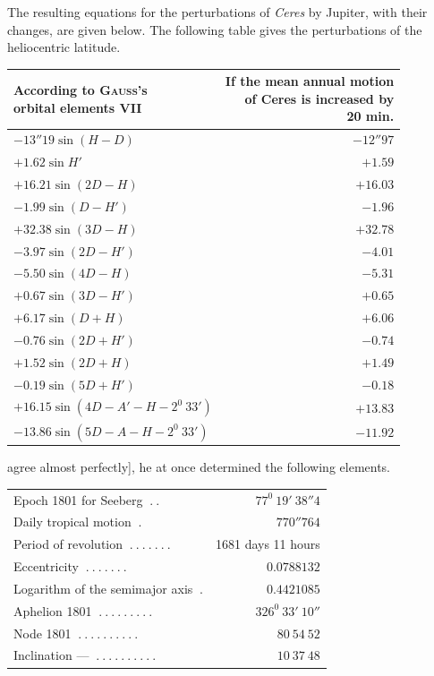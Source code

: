 The resulting equations for the perturbations of \textit{Ceres} by Jupiter, with their changes, are given below.
%
The following table gives the perturbations of the heliocentric latitude.
\begin{center}
\begingroup\small
\begin{tabular}{l|r}
\shortstack{According to \textsc{Gauss}’s\\orbital elements VII}&\shortstack{If the mean annual motion\\of Ceres is increased by\\20 min.}\\\hline
$-13''19\sin(H-D)$&$-12''97$\\
$+1.62\sin H'$&$+1.59$\\[3pt]
$+16.21\sin(2D-H)$&$+16.03$\\
$-1.99\sin(D-H')$&$-1.96$\\[3pt]
$+32.38\sin(3D-H)$&$+32.78$\\
$-3.97\sin(2D-H')$&$-4.01$\\[3pt]
$-5.50\sin(4D-H)$&$-5.31$\\
$+0.67\sin(3D-H')$&$+0.65$\\[3pt]
$+6.17\sin(D+H)$&$+6.06$\\
$-0.76\sin(2D+H')$&$-0.74$\\[3pt]
$+1.52\sin(2D+H)$&$+1.49$\\
$-0.19\sin(5D+H')$&$-0.18$\\[3pt]
$+16.15\sin(4D-A'-H-2^0\ 33')$&$+13.83$\\
$-13.86\sin(5D-A-H-2^0\ 33')$&$-11.92$
\end{tabular}\endgroup
\end{center}
agree almost perfectly], he at once determined the following elements.
\begin{center}
\begingroup\small\setlength{\tabcolsep}{3pt}
\begin{tabular}{l r}
Epoch 1801 for Seeberg $\ .\ .$&$77^0\ 19'\ 38''4$\\
Daily tropical motion $\ .$&$770''764$\\
Period of revolution $\ .\ .\ .\ .\ .\ .\ .$&1681 days 11 hours\\
Eccentricity $\ .\ .\ .\ .\ .\ .\ .$&$0.0788132$\\[3pt]
Logarithm of the semimajor axis $\ .$&$0.4421085$\\
Aphelion 1801 $\ .\ .\ .\ .\ .\ .\ .\ .\ .$&$326^0\ 33'\ 10''$\\
Node 1801 $\ .\ .\ .\ .\ .\ .\ .\ .\ .\ .$&$80\ 54\ 52$\\
Inclination — $\ .\ .\ .\ .\ .\ .\ .\ .\ .\ .$&$10\ 37\ 48$
\end{tabular}\endgroup
\end{center}

